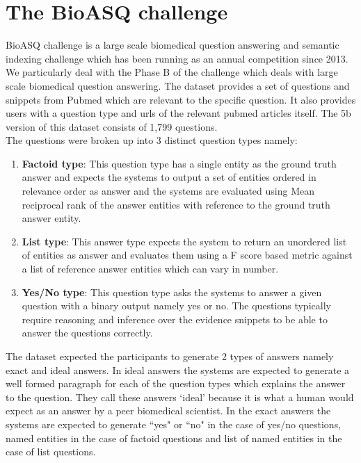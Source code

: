 \documentclass[11pt,a4paper]{article}
\begin{document}
\section{The BioASQ challenge}
\label{Dataset}
BioASQ challenge \cite{bioasq} is a large scale biomedical question answering and semantic indexing challenge which has been running as an annual competition since 2013. %
We particularly deal with the Phase B of the challenge which deals with large scale biomedical question answering. The dataset provides a set of questions and snippets from Pubmed which are relevant to the specific question. It also provides users with a question type and urls of the relevant pubmed articles itself. The 5b version of this dataset consists of 1,799 questions.\\
The questions were broken up into 3 distinct question types namely:\\
\begin{enumerate}
    \item \textbf{Factoid type}: This question type has a single entity as the ground truth answer and expects the systems to output a set of  entities ordered in relevance order as answer and the systems are evaluated using Mean reciprocal rank \cite{MRR} of the answer entities with reference to the ground truth answer entity.
    \item \textbf{List type}: This answer type expects the system to return an unordered list of entities as answer and evaluates them using a F score based metric against a list of reference answer entities which can vary in number.
    \item \textbf{Yes/No type}: This question type asks the systems to answer a given question with a binary output namely yes or no. The questions typically require reasoning and inference over the evidence snippets to be able to answer the questions correctly.
\end{enumerate}

The dataset expected the participants to generate 2 types of answers namely exact and ideal answers. 
In ideal answers the systems are expected to generate a well formed paragraph for each of the question types which explains the answer to the question. They call these answers `ideal' because it is what a human would expect as an answer by a peer biomedical scientist. In the exact answers the systems are expected to generate ``yes" or ``no" in the case of yes/no questions, named entities in the case of factoid questions and list of named entities in the case of list questions.
\end{document}
